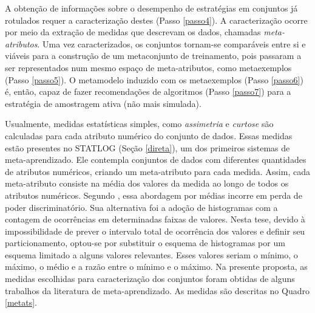 A obtenção de informações sobre o desempenho de estratégias em conjuntos já rotulados requer a caracterização destes (Passo \ref{passo4}).
A caracterização ocorre por meio da extração de medidas que descrevam os dados, chamadas \textit{meta-atributos}.
Uma vez caracterizados, os conjuntos tornam-se comparáveis entre si e viáveis para a construção de um metaconjunto de treinamento, pois passaram a ser representados num mesmo espaço de meta-atributos, como metaexemplos (Passo \ref{passo5}).
O metamodelo induzido com os metaexemplos (Passo \ref{passo6}) é, então, capaz de fazer recomendações de algoritmos (Passo \ref{passo7}) para a estratégia de amostragem ativa (não mais simulada).

Usualmente, medidas estatísticas simples, como \textit{assimetria} e \textit{curtose} são calculadas para cada atributo numérico do conjunto de dados.
Essas medidas estão presentes no STATLOG (Seção \ref{direta}), um dos primeiros sistemas de meta-aprendizado.
Ele contempla conjuntos de dados com diferentes quantidades de atributos numéricos, criando um meta-atributo para cada medida.
Assim, cada meta-atributo consiste na média dos valores da medida ao longo de todos os atributos numéricos.
Segundo , essa abordagem por médias incorre em perda de poder discriminatório.
Sua alternativa foi a adoção de histogramas com a contagem de ocorrências em determinadas faixas de valores.
Nesta tese, devido à impossibilidade de prever o intervalo total de ocorrência dos valores e definir seu particionamento, optou-se por substituir o esquema de histogramas por um esquema limitado a alguns valores relevantes.
Esses valores seriam o mínimo, o máximo, o médio e a razão entre o mínimo e o máximo.
Na presente proposta, as medidas escolhidas para caracterização dos conjuntos foram obtidas de alguns trabalhos da literatura de meta-aprendizado.
As medidas são descritas no Quadro \ref{metats}.
